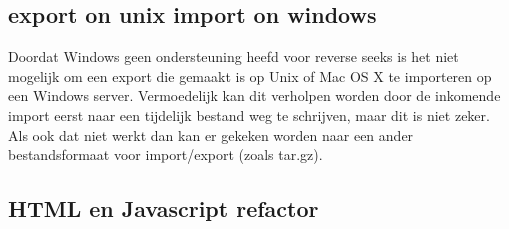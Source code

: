 \subsection{export on unix import on windows}
Doordat Windows geen ondersteuning heefd voor reverse seeks is het niet mogelijk om een export die gemaakt is op Unix of Mac OS X te importeren op een Windows server. Vermoedelijk kan dit verholpen worden door de inkomende import eerst naar een tijdelijk bestand weg te schrijven, maar dit is niet zeker. Als ook dat niet werkt dan kan er gekeken worden naar een ander bestandsformaat voor import/export (zoals tar.gz).

\subsection{HTML en Javascript refactor}
